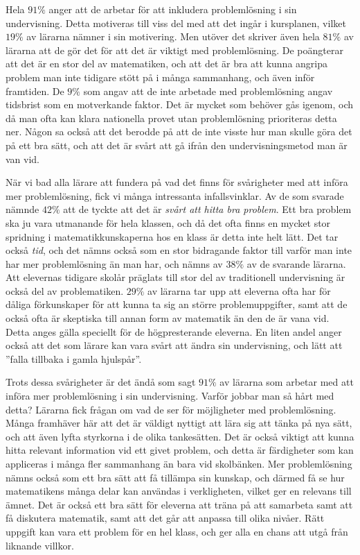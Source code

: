 \textcolor{lila}{Hela $91\%$ anger att de arbetar för att inkludera problemlösning i sin undervisning. Detta motiveras till viss del med att det ingår i kursplanen, vilket $19\%$ av lärarna nämner i sin motivering. Men utöver det skriver även hela $81\%$ av lärarna att de gör det för att det är viktigt med problemlösning. De poängterar att det är en stor del av matematiken, och att det är bra att kunna angripa problem man inte tidigare stött på i många sammanhang, och även inför framtiden. De $9\%$ som angav att de inte arbetade med problemlösning angav tidsbrist som en motverkande faktor. Det är mycket som behöver gås igenom, och då man ofta kan klara nationella provet utan problemlösning prioriteras detta ner. Någon sa också att det berodde på att de inte visste hur man skulle göra det på ett bra sätt, och att det är svårt att gå ifrån den undervisningsmetod man är van vid.}

\textcolor{lila}{När vi bad alla lärare att fundera på vad det finns för svårigheter med att införa mer problemlösning, fick vi många intressanta infallsvinklar. Av de som svarade nämnde $42\%$ att de tyckte att det är \textsl{svårt att hitta bra problem}. Ett bra problem ska ju vara utmanande för hela klassen, och då det ofta finns en mycket stor spridning i matematikkunskaperna hos en klass är detta inte helt lätt. Det tar också \textsl{tid}, och det nämns också som en stor bidragande faktor till varför man inte har mer problemlösning än man har, och nämns av $38\%$ av de svarande lärarna. Att elevernas tidigare skolår präglats till stor del av traditionell undervisning är också del av problematiken. $29\%$ av lärarna tar upp att eleverna ofta har för dåliga förkunskaper för att kunna ta sig an större problemuppgifter, samt att de också ofta är skeptiska till annan form av matematik än den de  är vana vid. Detta anges gälla speciellt för de högpresterande eleverna. En liten andel anger också att det som lärare kan vara svårt att ändra sin undervisning, och lätt att ''falla tillbaka i gamla hjulspår''.}

\textcolor{lila}{Trots dessa svårigheter är det ändå som sagt $91\%$ av lärarna som arbetar med att införa mer problemlösning i sin undervisning. Varför jobbar man så hårt med detta? Lärarna fick frågan om vad de ser för möjligheter med problemlösning. Många framhäver här att det är väldigt nyttigt att lära sig att tänka på nya sätt, och att även lyfta styrkorna i de olika tankesätten. Det är också viktigt att kunna hitta relevant information vid ett givet problem, och detta är färdigheter som kan appliceras i många fler sammanhang än bara vid skolbänken. Mer problemlösning nämns också som ett bra sätt att få tillämpa sin kunskap, och därmed få se hur matematikens många delar kan användas i verkligheten, vilket ger en relevans till ämnet. Det är också ett bra sätt för eleverna att träna på att samarbeta samt att få diskutera matematik, samt att det går att anpassa till olika nivåer. Rätt uppgift kan vara ett problem för en hel klass, och ger alla en chans att utgå från liknande villkor.}